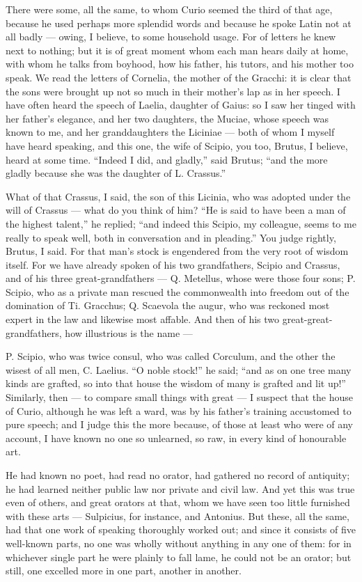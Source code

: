 There were some, all the same, to whom Curio seemed the third of that age, because he used perhaps more splendid words and because he spoke Latin not at all badly — owing, I believe, to some household usage. For of letters he knew next to nothing; but it is of great moment whom each man hears daily at home, with whom he talks from boyhood, how his father, his tutors, and his mother too speak. We read the letters of Cornelia, the mother of the Gracchi: it is clear that the sons were brought up not so much in their mother's lap as in her speech. I have often heard the speech of Laelia, daughter of Gaius: so I saw her tinged with her father's elegance, and her two daughters, the Muciae, whose speech was known to me, and her granddaughters the Liciniae — both of whom I myself have heard speaking, and this one, the wife of Scipio, you too, Brutus, I believe, heard at some time. ``Indeed I did, and gladly,'' said Brutus; ``and the more gladly because she was the daughter of L. Crassus.''

 What of that Crassus, I said, the son of this Licinia, who was adopted under the will of Crassus — what do you think of him? ``He is said to have been a man of the highest talent,'' he replied; ``and indeed this Scipio, my colleague, seems to me really to speak well, both in conversation and in pleading.'' You judge rightly, Brutus, I said. For that man's stock is engendered from the very root of wisdom itself. For we have already spoken of his two grandfathers, Scipio and Crassus, and of his three great-grandfathers — Q. Metellus, whose were those four sons; P. Scipio, who as a private man rescued the commonwealth into freedom out of the domination of Ti. Gracchus; Q. Scaevola the augur, who was reckoned most expert in the law and likewise most affable. And then of his two great-great-grandfathers, how illustrious is the name —

 P. Scipio, who was twice consul, who was called Corculum, and the other the wisest of all men, C. Laelius. ``O noble stock!'' he said; ``and as on one tree many kinds are grafted, so into that house the wisdom of many is grafted and lit up!'' Similarly, then — to compare small things with great — I suspect that the house of Curio, although he was left a ward, was by his father's training accustomed to pure speech; and I judge this the more because, of those at least who were of any account, I have known no one so unlearned, so raw, in every kind of honourable art.

 He had known no poet, had read no orator, had gathered no record of antiquity; he had learned neither public law nor private and civil law. And yet this was true even of others, and great orators at that, whom we have seen too little furnished with these arts — Sulpicius, for instance, and Antonius. But these, all the same, had that one work of speaking thoroughly worked out; and since it consists of five well-known parts, no one was wholly without anything in any one of them: for in whichever single part he were plainly to fall lame, he could not be an orator; but still, one excelled more in one part, another in another.

